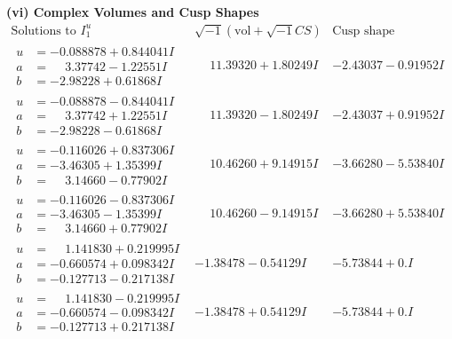 \documentclass[1p]{elsarticle_modified}
\theoremstyle{definition}
\newcommand{\I}{\sqrt{-1}}
\begin{document}
\newpage\flushleft \textbf{(vi) Complex Volumes and Cusp Shapes}
$$\begin{array}{c|c|c}  
\text{Solutions to }I^u_{1}& \I (\text{vol} + \sqrt{-1}CS) & \text{Cusp shape}\\
 \hline 
\begin{aligned}
u &= -0.088878 + 0.844041 I \\
a &= \phantom{-}3.37742 - 1.22551 I \\
b &= -2.98228 + 0.61868 I\end{aligned}
 & \phantom{-}11.39320 + 1.80249 I & -2.43037 - 0.91952 I \\ \hline\begin{aligned}
u &= -0.088878 - 0.844041 I \\
a &= \phantom{-}3.37742 + 1.22551 I \\
b &= -2.98228 - 0.61868 I\end{aligned}
 & \phantom{-}11.39320 - 1.80249 I & -2.43037 + 0.91952 I \\ \hline\begin{aligned}
u &= -0.116026 + 0.837306 I \\
a &= -3.46305 + 1.35399 I \\
b &= \phantom{-}3.14660 - 0.77902 I\end{aligned}
 & \phantom{-}10.46260 + 9.14915 I & -3.66280 - 5.53840 I \\ \hline\begin{aligned}
u &= -0.116026 - 0.837306 I \\
a &= -3.46305 - 1.35399 I \\
b &= \phantom{-}3.14660 + 0.77902 I\end{aligned}
 & \phantom{-}10.46260 - 9.14915 I & -3.66280 + 5.53840 I \\ \hline\begin{aligned}
u &= \phantom{-}1.141830 + 0.219995 I \\
a &= -0.660574 + 0.098342 I \\
b &= -0.127713 - 0.217138 I\end{aligned}
 & -1.38478 - 0.54129 I & -5.73844 + 0. I\phantom{ +0.000000I} \\ \hline\begin{aligned}
u &= \phantom{-}1.141830 - 0.219995 I \\
a &= -0.660574 - 0.098342 I \\
b &= -0.127713 + 0.217138 I\end{aligned}
 & -1.38478 + 0.54129 I & -5.73844 + 0. I\phantom{ +0.000000I} \\ \hline\begin{aligned}

\end{aligned}
\end{array}$$
\end{document}
